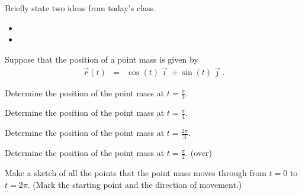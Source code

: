 \postClass

\begin{problem}
\item Briefly state two ideas from today's class.
  \begin{itemize}
  \item
  \item
  \end{itemize}
\item
  \begin{subproblem}
    \item
  \end{subproblem}
\end{problem}



\begin{problem}
\item Suppose that the position of a point mass is given by
  \begin{eqnarray*}
    \vec{r}(t) & = & \cos(t) \vec{\imath} + \sin(t) \vec{\jmath}.
  \end{eqnarray*}
  \begin{subproblem}
  \item Determine the position of the point mass at ${\displaystyle
      t=\frac{\pi}{3}}$.
    \vfill
  \item Determine the position of the point mass at ${\displaystyle
      t=\frac{\pi}{4}}$.
    \vfill
  \item Determine the position of the point mass at ${\displaystyle
      t=\frac{2\pi}{3}}$.
    \vfill
  \item Determine the position of the point mass at ${\displaystyle
      t=\frac{\pi}{2}}$.
    \vfill
    (over)
    \clearpage
  \item Make a sketch of all the points that the point mass moves
    through from $t=0$ to $t=2\pi$. (Mark the starting point and the
    direction of movement.)
    \vfill
  \end{subproblem}
\end{problem}


